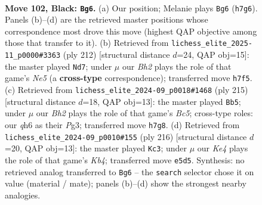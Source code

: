 \documentclass[11pt]{article}
\begin{document}
\clearpage

\begin{figure}[p]\centering
\begin{subfigure}{0.46\textwidth}\centering
\resizebox{\linewidth}{!}{%
\newchessgame
\chessboard[
  setfen={8/7b/7Q/4k1N1/1p6/4K3/4B3/8 b - - 0 102},
  showmover=false,
  pgfstyle=straightmove, color=movearrow, markmove={h7-g6}
]}
\caption{}
\end{subfigure}\hfill
\begin{subfigure}{0.46\textwidth}\centering
\resizebox{\linewidth}{!}{%
\newchessgame
\chessboard[
  setfen={8/8/3K4/4N1q1/5n2/8/5k2/8 w - - 4 107},
  showmover=false,
  pgfstyle=straightmove, color=movearrow, markmove={e5-d7}
]}
\caption{}
\end{subfigure}
\\[4pt]
\begin{subfigure}{0.46\textwidth}\centering
\resizebox{\linewidth}{!}{%
\newchessgame
\chessboard[
  setfen={8/8/8/8/2bK4/4N1pk/8/8 b - - 43 108},
  showmover=false,
  pgfstyle=straightmove, color=movearrow, markmove={c4-b5}
]}
\caption{}
\end{subfigure}\hfill
\begin{subfigure}{0.46\textwidth}\centering
\resizebox{\linewidth}{!}{%
\newchessgame
\chessboard[
  setfen={8/4n3/3k4/3B4/1K6/8/8/8 w - - 74 109},
  showmover=false,
  pgfstyle=straightmove, color=movearrow, markmove={b4-c3}
]}
\caption{}
\end{subfigure}
\caption{\textbf{Move 102, Black: \texttt{Bg6}.} (a) Our position; Melanie plays \texttt{Bg6} (\texttt{h7g6}). Panels (b)--(d) are the retrieved master positions whose correspondence most drove this move (highest QAP objective among those that transfer to it). (b) Retrieved from \texttt{lichess\_elite\_2025-11\_p0000\#3363} (ply 212) [structural distance $d$=24, QAP obj=15]: the master played \texttt{Nd7}; under $\mu$ our \emph{Bh2} plays the role of that game's \emph{Ne5} (a \textbf{cross-type} correspondence); transferred move \texttt{h7f5}. (c) Retrieved from \texttt{lichess\_elite\_2024-09\_p0018\#1468} (ply 215) [structural distance $d$=18, QAP obj=13]: the master played \texttt{Bb5}; under $\mu$ our \emph{Bh2} plays the role of that game's \emph{Bc5}; cross-type roles: our \emph{q}h6 as their \emph{P}g3; transferred move \texttt{h7g8}. (d) Retrieved from \texttt{lichess\_elite\_2024-09\_p0010\#155} (ply 216) [structural distance $d$=20, QAP obj=13]: the master played \texttt{Kc3}; under $\mu$ our \emph{Ke4} plays the role of that game's \emph{Kb4}; transferred move \texttt{e5d5}. Synthesis: no retrieved analog transferred to \texttt{Bg6} -- the \texttt{search} selector chose it on value (material / mate); panels (b)--(d) show the strongest nearby analogies.}
\label{fig:thought-m203}
\end{figure}
\end{document}
